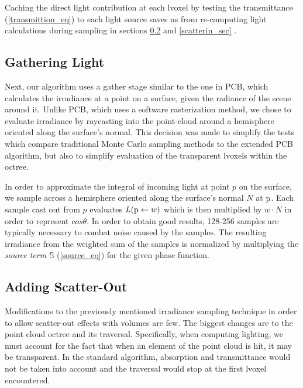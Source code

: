 \documentclass[runningheads]{llncs}
\begin{document}
Caching the direct light contribution at each lvoxel by testing the transmittance (\ref{transmittion_eq}) to each light source saves us from re-computing light calculations during sampling in sections \ref{scatterout_sec} and \ref{scatterin_sec} \cite{signotes:2010}.


\subsection{Gathering Light}

Next, our algorithm uses a gather stage similar to the one in PCB, which calculates the irradiance at a point on a surface, given the radiance of the scene around it.  Unlike PCB, which uses a software rasterization method, we chose to evaluate irradiance by raycasting into the point-cloud around a hemisphere oriented along the surface's normal.  This decision was made to simplify the tests which compare traditional Monte Carlo sampling methods to the extended PCB algorithm, but also to simplify evaluation of the transparent lvoxels within the octree.

In order to approximate the integral of incoming light at point $p$ on the surface, we sample across a hemisphere oriented along the surface's normal $N$ at $\textup{p}$.  Each sample cast out from $p$ evaluates $L(\textup{p} \leftarrow w)$ which is then multiplied by $w \cdot N$ in order to represent $cos\theta$.  In order to obtain good results, 128-256 samples are typically necessary to combat noise caused by the samples.  The resulting irradiance from the weighted sum of the samples is normalized by multiplying the \textit{source term} $\mathbb{S}$ (\ref{source_eq}) for the given phase function. 


\subsection{Adding Scatter-Out}
\label{scatterout_sec}
Modifications to the previously mentioned irradiance sampling technique in order to allow scatter-out effects with volumes are few.  The biggest changes are to the point cloud octree and its traversal.  Specifically, when computing lighting, we must account for the fact that when an element of the point cloud is hit, it may be transparent.  In the standard algorithm, absorption and transmittance would not be taken into account and the traversal would stop at the first lvoxel encountered.
\end{document}

